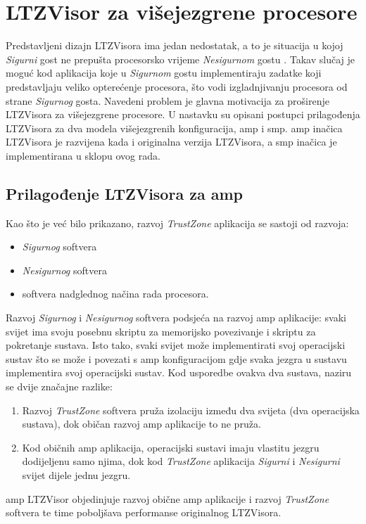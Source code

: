 \documentclass[times, utf8, diplomski, numeric]{fer}
\begin{document}
\chapter{LTZVisor za višejezgrene procesore}
Predstavljeni dizajn LTZVisora ima jedan nedostatak, a to je situacija u kojoj \textit{Sigurni} gost ne prepušta procesorsko
vrijeme \textit{Nesigurnom} gostu \cite{amp_ltzvisor}. Takav slučaj je moguć kod aplikacija koje u \textit{Sigurnom} gostu
implementiraju zadatke koji predstavljaju veliko opterećenje procesora, što vodi izgladnjivanju procesora od strane
\textit{Sigurnog} gosta. Navedeni problem je glavna motivacija za proširenje LTZVisora za višejezgrene procesore. U nastavku su
opisani postupci prilagođenja LTZVisora za dva modela višejezgrenih konfiguracija, \gls{amp} i \gls{smp}. \gls{amp} inačica LTZVisora je razvijena
kada i originalna verzija LTZVisora, a \gls{smp} inačica je implementirana u sklopu ovog rada.

\section{Prilagođenje LTZVisora za \gls{amp}}
Kao što je već bilo prikazano, razvoj \textit{TrustZone} aplikacija se sastoji od razvoja:
\begin{itemize}
  \item {\textit{Sigurnog} softvera}
  \item{\textit{Nesigurnog} softvera}
  \item{softvera nadglednog načina rada procesora.}
\end{itemize}
Razvoj \textit{Sigurnog} i \textit{Nesigurnog} softvera podsjeća na razvoj \gls{amp} aplikacije: svaki svijet ima svoju posebnu
skriptu za memorijsko povezivanje i skriptu za pokretanje sustava. Isto tako, svaki svijet može implementirati svoj operacijski
sustav što se može i povezati s \gls{amp} konfiguracijom gdje svaka jezgra u sustavu implementira svoj operacijski sustav. Kod
usporedbe ovakva dva sustava, naziru se dvije značajne razlike:
\begin{enumerate}
  \item {Razvoj \textit{TrustZone} softvera pruža izolaciju između dva svijeta (dva operacijska sustava), dok običan razvoj
  \gls{amp} aplikacije to ne pruža.}
  \item{Kod običnih \gls{amp} aplikacija, operacijski sustavi imaju vlastitu jezgru dodijeljenu samo njima, dok kod
  \textit{TrustZone} aplikacija \textit{Sigurni} i \textit{Nesigurni} svijet dijele jednu jezgru.}
\end{enumerate}
\gls{amp} LTZVisor objedinjuje razvoj obične \gls{amp} aplikacije i razvoj \textit{TrustZone} softvera te time poboljšava performanse
originalnog LTZVisora.
\end{document}
